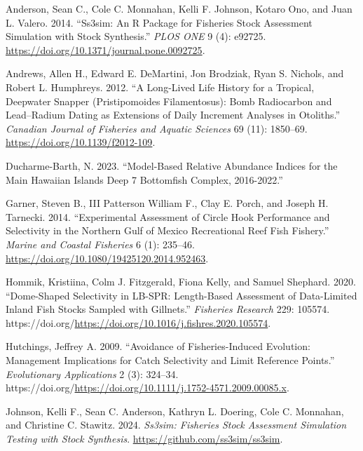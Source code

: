 \documentclass[
  letterpaper,
  12pt,
  letterpaper]{report}
\newlength{\cslhangindent}
\newenvironment{CSLReferences}[2] %
 {\begin{list}{}{%
  \setlength{\itemindent}{0pt}
  \setlength{\leftmargin}{0pt}
  \setlength{\parsep}{0pt}
  \ifodd #1
   \setlength{\leftmargin}{\cslhangindent}
   \setlength{\itemindent}{-1\cslhangindent}
  \fi
  \setlength{\itemsep}{#2\baselineskip}}}
 {\end{list}}
\begin{document}
\label{refs}
\begin{CSLReferences}{1}{0}
Anderson, Sean C., Cole C. Monnahan, Kelli F. Johnson, Kotaro Ono, and
Juan L. Valero. 2014. {``Ss3sim: An {R} Package for Fisheries Stock
Assessment Simulation with {Stock Synthesis}.''} \emph{PLOS ONE} 9 (4):
e92725. \url{https://doi.org/10.1371/journal.pone.0092725}.

Andrews, Allen H., Edward E. DeMartini, Jon Brodziak, Ryan S. Nichols,
and Robert L. Humphreys. 2012. {``A Long-Lived Life History for a
Tropical, Deepwater Snapper ({Pristipomoides} Filamentosus): Bomb
Radiocarbon and Lead--Radium Dating as Extensions of Daily Increment
Analyses in Otoliths.''} \emph{Canadian Journal of Fisheries and Aquatic
Sciences} 69 (11): 1850--69. \url{https://doi.org/10.1139/f2012-109}.

Ducharme-Barth, N. 2023. {``Model-Based Relative Abundance Indices for
the Main {Hawaiian} {Islands} {Deep} 7 Bottomfish Complex, 2016-2022.''}

Garner, Steven B., III Patterson William F., Clay E. Porch, and Joseph
H. Tarnecki. 2014. {``Experimental {Assessment} of {Circle} {Hook}
{Performance} and {Selectivity} in the {Northern} {Gulf} of {Mexico}
{Recreational} {Reef} {Fish} {Fishery}.''} \emph{Marine and Coastal
Fisheries} 6 (1): 235--46.
\url{https://doi.org/10.1080/19425120.2014.952463}.

Hommik, Kristiina, Colm J. Fitzgerald, Fiona Kelly, and Samuel Shephard.
2020. {``Dome-Shaped Selectivity in LB-SPR: Length-Based Assessment of
Data-Limited Inland Fish Stocks Sampled with Gillnets.''}
\emph{Fisheries Research} 229: 105574.
https://doi.org/\url{https://doi.org/10.1016/j.fishres.2020.105574}.

Hutchings, Jeffrey A. 2009. {``Avoidance of Fisheries-Induced Evolution:
Management Implications for Catch Selectivity and Limit Reference
Points.''} \emph{Evolutionary Applications} 2 (3): 324--34.
https://doi.org/\url{https://doi.org/10.1111/j.1752-4571.2009.00085.x}.

Johnson, Kelli F., Sean C. Anderson, Kathryn L. Doering, Cole C.
Monnahan, and Christine C. Stawitz. 2024. \emph{Ss3sim: Fisheries Stock
Assessment Simulation Testing with Stock Synthesis}.
\url{https://github.com/ss3sim/ss3sim}.


\end{CSLReferences}
\end{document}
